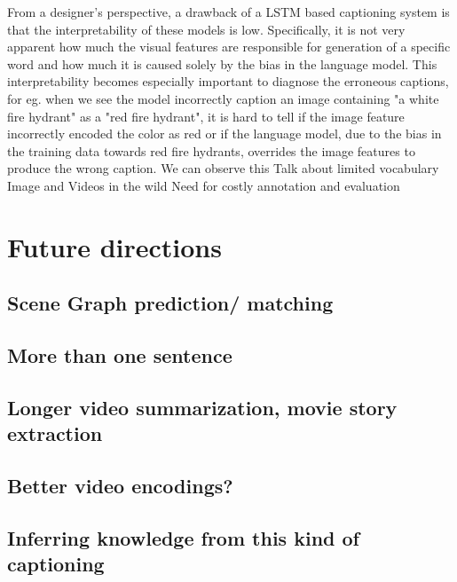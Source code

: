 From a designer's perspective, a drawback of a LSTM based captioning system is
that the interpretability of these models is low.
Specifically, it is not very apparent how much the visual features are
responsible for generation of a specific word and how much it is caused solely
by the bias in the language model.
This interpretability becomes especially important to diagnose the erroneous
captions, for eg. when we see the model incorrectly caption an image containing
"a white fire hydrant" as a "red fire hydrant", it is hard to tell if the image
feature incorrectly encoded the color as red or if the language model, due to
the bias in the training data towards red fire hydrants, overrides the image
features to produce the wrong caption.  
We can observe this 
Talk about limited vocabulary
Image and Videos in the wild
Need for costly annotation and evaluation

\section{Future directions}
\subsection{Scene Graph prediction/ matching}
\subsection{More than one sentence}
\subsection{Longer video summarization, movie story extraction}
\subsection{Better video encodings?}
\subsection{Inferring knowledge from this kind of captioning}

